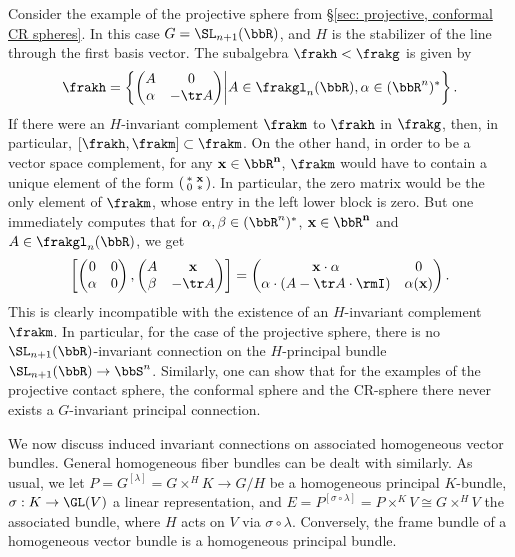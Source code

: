 \begin{example}\label{ex 1.4.6(2) Cap}
    Consider the example of the projective sphere from \S\ref{sec: projective, conformal CR spheres}. In this case $G=\SL_{n+1}(\bbR)$, and $H$ is the stabilizer of the line through the first basis vector. The subalgebra $\frakh< \frakg$ is given by 
    \[\frakh=\left\{\begin{pmatrix}A & 0\\ \alpha & -\tr A\end{pmatrix}\middle| A\in\frakgl_n(\bbR),\alpha\in(\bbR^n)^\ast\right\}.\]
    If there were an $H$-invariant complement $\frakm$ to $\frakh$ in $\frakg$, then, in particular, $[\frakh,\frakm]\subset\frakm$. On the other hand, in order to be a vector space complement, for any $\bf{x}\in\bbR^n$, $\frakm$ would have to contain a unique element of the form $\left(\begin{smallmatrix}
        \ast &\bf{x}\\0&\ast
    \end{smallmatrix}\right)$. In particular, the zero matrix would be the only element of $\frakm$, whose entry in the left lower block is zero. But one immediately computes that for $\alpha,\beta\in(\bbR^n)^\ast$, $\bf{x}\in\bbR^n$ and $A\in\frakgl_n(\bbR)$, we get 
    \[\left[\begin{pmatrix}
        0&0\\\alpha&0
    \end{pmatrix},
    \begin{pmatrix}
        A&\bf{x}\\
        \beta&-\tr A
    \end{pmatrix}
    \right]
    =
    \begin{pmatrix}
        \bf{x}\cdot \alpha& 0\\
        \alpha\cdot (A-\tr A\cdot \rmI)& \alpha(\bf{x})
    \end{pmatrix}.
    \]
    This is clearly incompatible with the existence of an $H$-invariant complement $\frakm$. In particular, for the case of the projective sphere, there is no $\SL_{n+1}(\bbR)$-invariant connection on the $H$-principal bundle $\SL_{n+1}(\bbR)\to \bbS^n$. Similarly, one can show that for the examples of the projective contact sphere, the conformal sphere and the CR-sphere there never exists a $G$-invariant principal connection.
\end{example}






We now discuss induced invariant connections on associated homogeneous vector bundles. General homogeneous fiber bundles can be dealt with similarly. As usual, we let $P=G^{[\lambda]}=G\times^H K\to G\slash H$ be a homogeneous principal $K$-bundle, $\sigma:K\to \GL(V)$ a linear representation, and $E=P^{[\sigma\circ\lambda]}=P\times^K V\cong G\times^H V$ the associated bundle, where $H$ acts on $V$ via $\sigma\circ\lambda$. Conversely, the frame bundle of a homogeneous vector bundle is a homogeneous principal bundle. 

